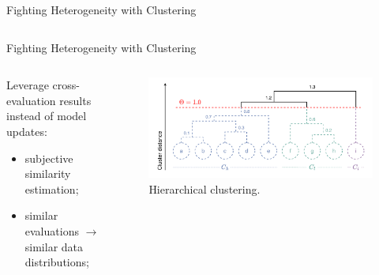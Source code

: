 \begin{frame}{Fighting Heterogeneity with Clustering}
\begin{columns}
\begin{column}{.45\textwidth}
        \end{column}
    \end{columns}

\end{frame}

\begin{frame}{Fighting Heterogeneity with Clustering}
    \begin{columns}
        \begin{column}{.4\textwidth}

        Leverage cross-evaluation results instead of model updates:
        \begin{itemize}
            \item subjective similarity estimation;
            \item similar evaluations $\rightarrow$ similar data distributions;
        \end{itemize}

        \end{column}
        \begin{column}{.6\textwidth}
            \begin{figure}
                \centering
                \includegraphics[width=\textwidth]{figures/radar/clustering.drawio.pdf}
                \caption{Hierarchical clustering.}
            \end{figure}
        \end{column}
    \end{columns}
\end{frame}


